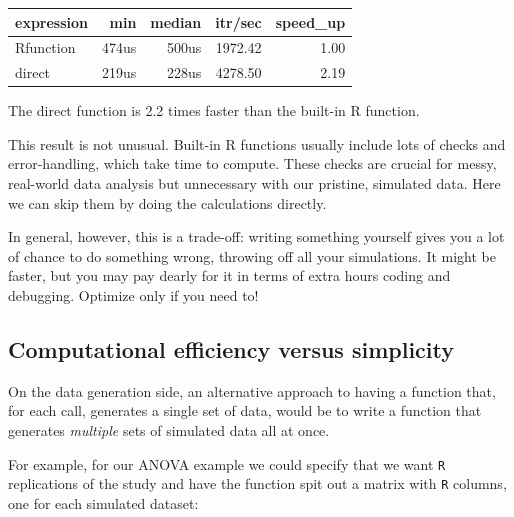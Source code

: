 \documentclass[
]{book}
\begin{document}
\begin{tabular}{l|r|r|r|r}
\hline
expression & min & median & itr/sec & speed\_up\\
\hline
Rfunction & 474us & 500us & 1972.42 & 1.00\\
\hline
direct & 219us & 228us & 4278.50 & 2.19\\
\hline
\end{tabular}

The direct function is 2.2 times faster than the built-in R function.

This result is not unusual.
Built-in R functions usually include lots of checks and error-handling, which take time to compute. These checks are crucial for messy, real-world data analysis but unnecessary with our pristine, simulated data.
Here we can skip them by doing the calculations directly.

In general, however, this is a trade-off: writing something yourself gives you a lot of chance to do something wrong, throwing off all your simulations.
It might be faster, but you may pay dearly for it in terms of extra hours coding and debugging.
Optimize only if you need to!

\subsection{Computational efficiency versus simplicity}\label{sec_comp_efficiency}

On the data generation side, an alternative approach to having a function that, for each call, generates a single set of data, would be to write a function that generates \emph{multiple} sets of simulated data all at once.

For example, for our ANOVA example we could specify that we want \texttt{R} replications of the study and have the function spit out a matrix with \texttt{R} columns, one for each simulated dataset:
\end{document}
